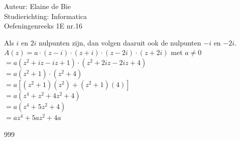 \documentclass[a4paper]{article}
\begin{document}
  
 
\noindent \large Auteur: Elaine de Bie\\
\noindent \large Studierichting: Informatica\\
\noindent \large Oefeningenreeks 1E nr.16 \\

\medskip


\normalsize


Als $i$ en $2i$ nulpunten zijn, dan volgen daaruit ook de nulpunten $-i$ en $-2i$.\\

$A(z) = a\cdot(z-i)\cdot(z+i)\cdot(z-2i)\cdot(z+2i)$ met $a \neq 0$\\

$=a(z^2 + iz - iz +1)\cdot(z^2 +2iz - 2iz +4)$\\

$=a(z^2 + 1)\cdot(z^2 + 4)$\\

$=a [(z^2 + 1)(z^2) + (z^2 + 1)(4)]$\\

$=a (z^4 + z^2 + 4z^2 + 4)$\\

$=a (z^4 + 5z^2 + 4)$\\

$=az^4 + 5az^2 + 4a$\\



\begin{thebibliography}{999}
\end{thebibliography}
\end{document}
